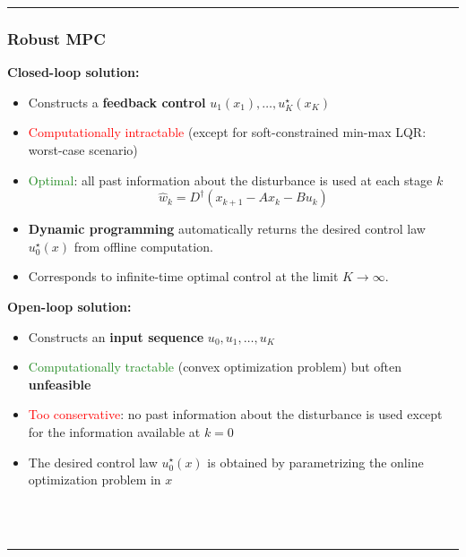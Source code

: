 \hrule

\subsubsection{Robust MPC}
\begin{minipage}[t]{0.48\textwidth}
\textbf{Closed-loop solution:}
\begin{itemize}
    \item Constructs a \textbf{feedback control} $u_1(x_1), \ldots, u_K^\star(x_K)$
    \item \textcolor{red}{Computationally intractable} (except for soft-constrained min-max LQR: worst-case scenario)
    \item \textcolor{ForestGreen}{Optimal}: all past information about the disturbance is used at each stage $k$
    \[
    \hat{w}_k = D^\dagger(x_{k+1} - A x_k - B u_k)
    \]
    \item \textbf{Dynamic programming} automatically returns the desired control law $u_0^\star(x)$ from offline computation.
    \item Corresponds to infinite-time optimal control at the limit $K \rightarrow \infty$.
\end{itemize}
\end{minipage}
\hfill
\begin{minipage}[t]{0.48\textwidth}
\textbf{Open-loop solution:}
\begin{itemize}
    \item Constructs an \textbf{input sequence} $u_0, u_1, \ldots, u_K$
    \item \textcolor{ForestGreen}{Computationally tractable} (convex optimization problem) but often \textbf{unfeasible}
    \item \textcolor{red}{Too conservative}: no past information about the disturbance is used except for the information available at $k=0$
    \item The desired control law $u_0^\star(x)$ is obtained by parametrizing the online optimization problem in $x$
\end{itemize}
\end{minipage}\\ \\

\hrule

